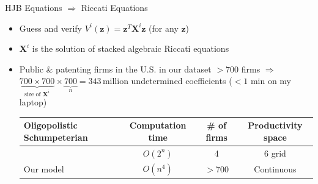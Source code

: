 \documentclass[
  10pt,
  aspectratio=169,   %
]{beamer}
\theoremstyle{plain}
\begin{document}
\begin{frame}{HJB Equations $\Longrightarrow$ Riccati Equations}

  \label{hjb}
  \begin{itemize}
    \item Guess and verify $V^{i}\left(\bm{z}\right)=\bm{z}^{T}\bm{X}^{i}\bm{z}$
          (for any $\bm{z}$) \medskip{}
    \item $\bm{X}^{i}$ is the solution of stacked algebraic Riccati equations

          \hyperlink{riccati}{}\medskip{}\pause
    \item Public \& patenting firms in the U.S. in our dataset $> 700$
          firms $\Longrightarrow$ \\
          $\underbrace{700\times700}_{\text{size of } \bm{X}^{i}} \times \underbrace{700}_{n}=343\,\text{million}$ undetermined coefficients ($< 1$ min on my laptop)\medskip{} \pause
          \begin{center}
            \begin{tabular}{@{}p{5cm}ccc@{}}
              \toprule
              Oligopolistic Schumpeterian & Computation time & \# of firms & Productivity space \\
              \midrule
              \citet{Cavenaile2023-lo}    & $O(2^n)$         & 4           & 6 grid             \\
              Our model                   & $O(n^4)$         & $>$700      & Continuous         \\
              \bottomrule
            \end{tabular}
          \end{center}
          \hyperlink{negative_rd_and_output}{}
  \end{itemize}
\end{frame}
\end{document}
